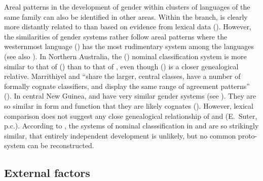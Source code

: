 \documentclass[output=collectionpaper]{langsci/langscibook}
\begin{document}
Areal patterns in the development of gender within clusters of languages of the same family can also be identified in other areas. Within the   branch,  is clearly more distantly related to  than \mbox{} based on evidence from lexical data (\citealt[6]{Nagaraja2013}). However, the similarities of gender systems rather follow areal patterns where the westernmost language  (\citealt{Nagaraja1996}) has the most rudimentary system among the  languages (see also ). In Northern Australia, the   () nominal classification system is more similar to that of  () than to that of , even though  () is a closer genealogical relative. Marrithiyel and  ``share the larger, central classes, have a number of formally cognate classifiers, and display the same range of agreement patterns'' (\citealt[233]{Green1997}). In central New Guinea,  and  have very similar gender systems (see ). They are so similar in form and function that they are likely cognates (\citealt[118]{Usher2015}). However, lexical comparison does not suggest any close genealogical relationship of  and  (E.~Suter, p.c.). According to \cite{Seifart2007}, the systems of nominal classsification in  and  are so strikingly similar, that entirely independent development is unlikely, but no common proto-system can be reconstructed.


  \subsection{External factors}
  \label{sec:WDG:11.2}
\end{document}
